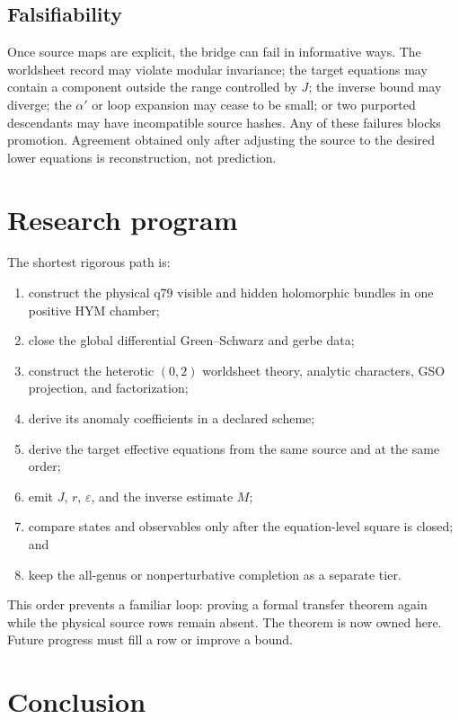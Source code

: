 \documentclass[11pt]{article}
\newcommand{\alphap}{\alpha'}
\begin{document}
\subsection{Falsifiability}

Once source maps are explicit, the bridge can fail in informative ways.
The worldsheet record may violate modular invariance; the target equations
may contain a component outside the range controlled by \(J\); the inverse
bound may diverge; the \(\alphap\) or loop expansion may cease to be small;
or two purported descendants may have incompatible source hashes.  Any of
these failures blocks promotion.  Agreement obtained only after adjusting
the source to the desired lower equations is reconstruction, not prediction.

\section{Research program}

The shortest rigorous path is:
\begin{enumerate}
\item construct the physical q79 visible and hidden holomorphic bundles in
one positive HYM chamber;
\item close the global differential Green--Schwarz and gerbe data;
\item construct the heterotic \((0,2)\) worldsheet theory, analytic
characters, GSO projection, and factorization;
\item derive its anomaly coefficients in a declared scheme;
\item derive the target effective equations from the same source and at the
same order;
\item emit \(J\), \(r\), \(\varepsilon\), and the inverse estimate \(M\);
\item compare states and observables only after the equation-level square is
closed; and
\item keep the all-genus or nonperturbative completion as a separate tier.
\end{enumerate}

This order prevents a familiar loop: proving a formal transfer theorem again
while the physical source rows remain absent.  The theorem is now owned here.
Future progress must fill a row or improve a bound.

\section{Conclusion}
\end{document}

